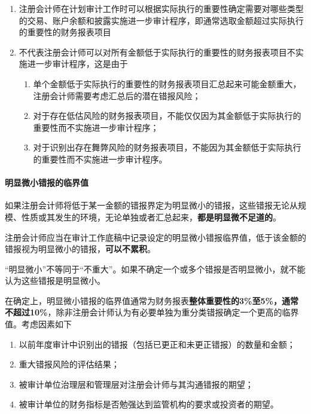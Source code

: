 \documentclass[UTF8,12pt]{ctexart}
\numberwithin{equation}{section} %
\numberwithin{figure}{section}
\numberwithin{table}{section}
\begin{document}
	\begin{enumerate}
		\item 注册会计师在计划审计工作时可以根据实际执行的重要性确定需要对哪些类型的交易、账户余额和披露实施进一步审计程序，即通常选取金额超过实际执行的重要性的财务报表项目
		
		\item 不代表注册会计师可以对所有金额低于实际执行的重要性的财务报表项目不实施进一步审计程序，这是由于
		\begin{enumerate}
			\item 单个金额低于实际执行的重要性的财务报表项目汇总起来可能金额重大，注册会计师需要考虑汇总后的潜在错报风险；
			
			\item 对于存在低估风险的财务报表项目，不能仅仅因为其金额低于实际执行的重要性而不实施进一步审计程序；
			
			\item 对于识别出存在舞弊风险的财务报表项目，不能因为其金额低于实际执行的重要性而不实施进一步审计程序。
		\end{enumerate}
	\end{enumerate}

	
	\paragraph{明显微小错报的临界值}
	如果注册会计师将低于某一金额的错报界定为明显微小的错报，这些错报无论从规模、性质或其发生的环境，无论单独或者汇总起来，\textbf{都是明显微不足道的}。
	
	注册会计师应当在审计工作底稿中记录设定的明显微小错报临界值，低于该金额的错报视为明显微小的错报，\textbf{可以不累积}。
	
	“明显微小”不等同于“不重大”。如果不确定一个或多个错报是否明显微小，就不能认为这些错报是明显微小。
	
	在确定上，明显微小错报的临界值通常为财务报表\textbf{整体重要性的3\%至5\%，通常不超过10\%}，除非注册会计师认为有必要单独为重分类错报确定一个更高的临界值。考虑因素如下
	\begin{enumerate}
		\item 以前年度审计中识别出的错报（包括已更正和未更正错报）的数量和金额；
		
		\item 重大错报风险的评估结果；
		
		\item 被审计单位治理层和管理层对注册会计师与其沟通错报的期望；
		
		\item 被审计单位的财务指标是否勉强达到监管机构的要求或投资者的期望。
		
	\end{enumerate}
\end{document}
